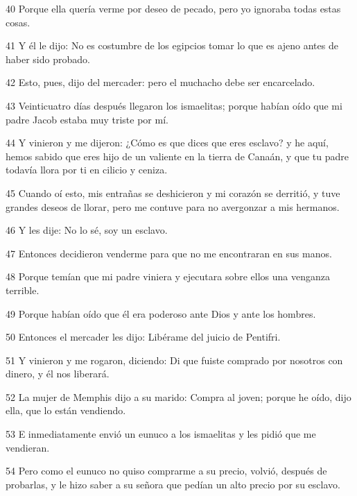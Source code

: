 \par 40 Porque ella quería verme por deseo de pecado, pero yo ignoraba todas estas cosas.

\par 41 Y él le dijo: No es costumbre de los egipcios tomar lo que es ajeno antes de haber sido probado.

\par 42 Esto, pues, dijo del mercader: pero el muchacho debe ser encarcelado.

\par 43 Veinticuatro días después llegaron los ismaelitas; porque habían oído que mi padre Jacob estaba muy triste por mí.

\par 44 Y vinieron y me dijeron: ¿Cómo es que dices que eres esclavo? y he aquí, hemos sabido que eres hijo de un valiente en la tierra de Canaán, y que tu padre todavía llora por ti en cilicio y ceniza.

\par 45 Cuando oí esto, mis entrañas se deshicieron y mi corazón se derritió, y tuve grandes deseos de llorar, pero me contuve para no avergonzar a mis hermanos.

\par 46 Y les dije: No lo sé, soy un esclavo.

\par 47 Entonces decidieron venderme para que no me encontraran en sus manos.

\par 48 Porque temían que mi padre viniera y ejecutara sobre ellos una venganza terrible.

\par 49 Porque habían oído que él era poderoso ante Dios y ante los hombres.

\par 50 Entonces el mercader les dijo: Libérame del juicio de Pentifri.

\par 51 Y vinieron y me rogaron, diciendo: Di que fuiste comprado por nosotros con dinero, y él nos liberará.

\par 52 La mujer de Memphis dijo a su marido: Compra al joven; porque he oído, dijo ella, que lo están vendiendo.

\par 53 E inmediatamente envió un eunuco a los ismaelitas y les pidió que me vendieran.

\par 54 Pero como el eunuco no quiso comprarme a su precio, volvió, después de probarlas, y le hizo saber a su señora que pedían un alto precio por su esclavo.

